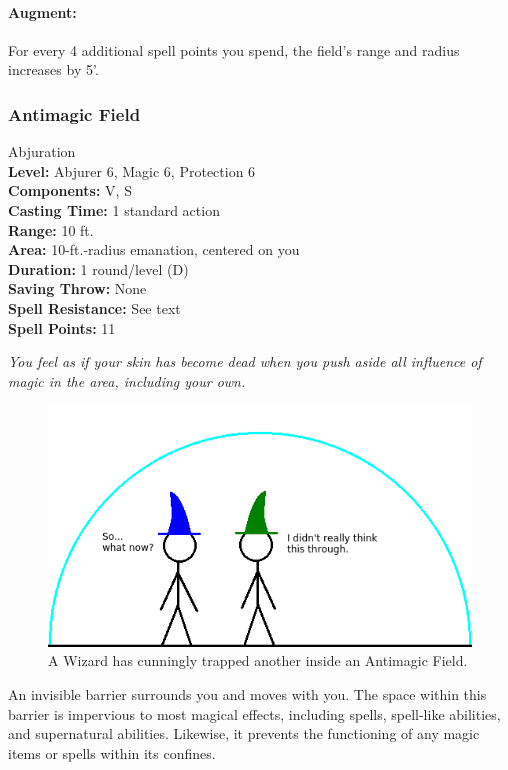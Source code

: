 \paragraph{Augment:} For every 4 additional spell points you spend, the field's range and radius increases by 5'.
\subsubsection{Antimagic Field}
\label{Spell:AntimagicField}
Abjuration
\\ \textbf{Level:} Abjurer 6, Magic 6, Protection 6
\\ \textbf{Components:} V, S
\\ \textbf{Casting Time:} 1 standard action
\\ \textbf{Range:} 10 ft.
\\ \textbf{Area:} 10-ft.-radius emanation, centered on you
\\ \textbf{Duration:} 1 round/level (D)
\\ \textbf{Saving Throw:} None
\\ \textbf{Spell Resistance:} See text
\\ \textbf{Spell Points:} 11

\emph{You feel as if your skin has become dead when you push aside all influence of magic in the area, including your own.}

\begin{figure}
  \caption{A Wizard has cunningly trapped another inside an Antimagic Field.}
  \centering
    \includegraphics{Pics/AMF.png}
\end{figure}

An invisible barrier surrounds you and moves with you. 
The space within this barrier is impervious to most magical effects, including spells, spell-like abilities, and supernatural abilities. 
Likewise, it prevents the functioning of any magic items or spells within its confines.

